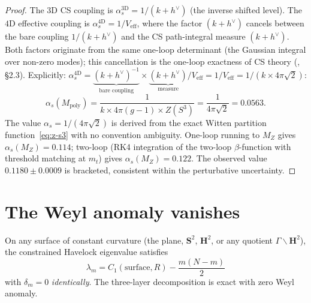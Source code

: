 \begin{proof}
The $3$D CS coupling is
$\alpha_s^{3\mathrm{D}} = 1/(k{+}h^\vee)$ (the inverse
shifted level).
The $4$D effective coupling is
$\alpha_s^{4\mathrm{D}} = 1/V_{\mathrm{eff}}$,
where the factor $(k{+}h^\vee)$ cancels between the
bare coupling $1/(k{+}h^\vee)$ and the CS path-integral
measure $(k{+}h^\vee)$.
Both factors originate from the same one-loop determinant
(the Gaussian integral over non-zero modes);
this cancellation is the one-loop exactness of CS theory
(\citealt{Witten1989Jones}, \S2.3).
Explicitly:
$\alpha_s^{4\mathrm{D}}
= \underbrace{(k{+}h^\vee)^{-1}}_{\text{bare coupling}}
\times \underbrace{(k{+}h^\vee)}_{\text{measure}}
/ V_{\mathrm{eff}}
= 1/V_{\mathrm{eff}}
= 1/(k \times 4\pi\sqrt{2})$:
\begin{equation}\label{eq:alpha-s}
  \alpha_s(M_{\mathrm{poly}})
  = \frac{1}{k \times 4\pi(g{-}1) \times Z(S^3)}
  = \frac{1}{4\pi\sqrt{2}}
  = 0.0563.
\end{equation}
The value $\alpha_s = 1/(4\pi\sqrt{2})$ is derived from
the exact Witten partition function~\eqref{eq:z-s3}
with no convention ambiguity.
One-loop running to $M_Z$ gives
$\alpha_s(M_Z) = 0.114$;
two-loop (RK4 integration of the two-loop
$\beta$-function with threshold matching at $m_t$)
gives $\alpha_s(M_Z) = 0.122$.
The observed value $0.1180 \pm 0.0009$ is bracketed,
consistent within the perturbative uncertainty.
\end{proof}


\section{The Weyl anomaly vanishes}
\label{sec:anomaly}

\begin{derivation}
\label{thm:zero-anomaly}
On any surface of constant curvature
(the plane, $\mathbf{S}^2$, $\mathbf{H}^2$, or any quotient
$\Gamma\backslash\mathbf{H}^2$), the constrained Havelock eigenvalue
satisfies
\[
  \lambda_m = C_1(\mathrm{surface}, R) - \frac{m(N{-}m)}{2}
\]
with $\delta_m = 0$ \emph{identically}.
The three-layer decomposition is exact with zero Weyl anomaly.
\end{derivation}

